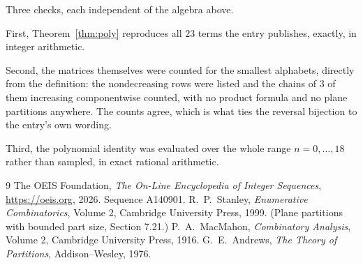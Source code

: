 \documentclass[11pt,a4paper]{article}
\theoremstyle{plain}
\theoremstyle{definition}
\begin{document}
Three checks, each independent of the algebra above.

First, Theorem~\ref{thm:poly} reproduces all $23$ terms the entry publishes,
exactly, in integer arithmetic.

Second, the matrices themselves were counted for the smallest alphabets, directly from the
definition: the nondecreasing rows were listed and the chains of $3$ of them increasing
componentwise counted, with no product formula and no plane partitions anywhere. The counts
agree, which is what ties the reversal bijection to the entry's own wording.

Third, the polynomial identity was evaluated over the whole range $n=0,\dots,18$ rather than
sampled, in exact rational arithmetic.

\begin{thebibliography}{9}
 The OEIS Foundation, \emph{The On-Line Encyclopedia of Integer
Sequences}, \url{https://oeis.org}, 2026. Sequence A140901.
 R.~P.~Stanley, \emph{Enumerative Combinatorics}, Volume 2, Cambridge
University Press, 1999. (Plane partitions with bounded part size, Section 7.21.)
 P.~A.~MacMahon, \emph{Combinatory Analysis}, Volume 2, Cambridge
University Press, 1916.
 G.~E.~Andrews, \emph{The Theory of Partitions}, Addison--Wesley, 1976.
\end{thebibliography}
\end{document}
